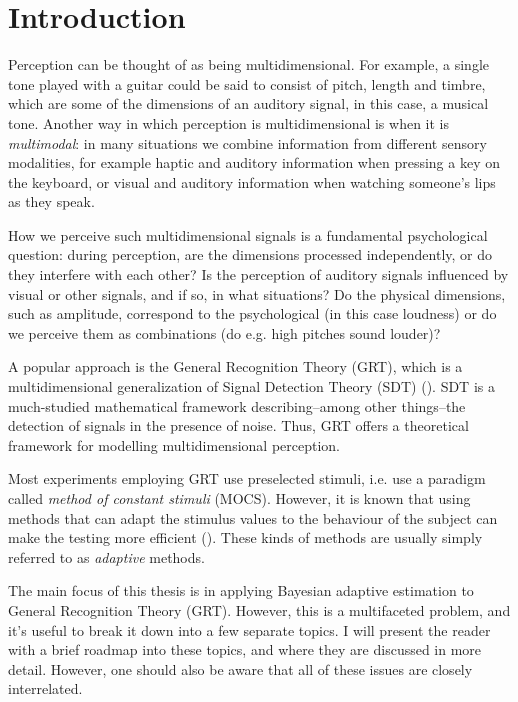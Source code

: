 \documentclass{article}\usepackage{knitr}
\begin{document}
\newpage

\tableofcontents

\newpage

\setcounter{page}{1}

\newpage


\section{Introduction}

Perception can be thought of as being multidimensional. For example, a single tone played with a guitar could be said to consist of pitch, length and timbre, which are some of the dimensions of an auditory signal, in this case, a musical tone. Another way in which perception is multidimensional is when it is \textit{multimodal}: in many situations we combine information from different sensory modalities, for example haptic and auditory information when pressing a key on the keyboard, or visual and auditory information when watching someone's lips as they speak.

How we perceive such multidimensional signals is a fundamental psychological question: during perception, are the dimensions processed independently, or do they interfere with each other? Is the perception of auditory signals influenced by visual or other signals, and if so, in what situations? Do the physical dimensions, such as amplitude, correspond to the psychological (in this case loudness) or do we perceive them as combinations (do e.g. high pitches sound louder)?

A popular approach is the General Recognition Theory (GRT), which is a multidimensional generalization of Signal Detection Theory (SDT) (\citealp{wickens2002,ashby1986, ashby2015}). SDT is a much-studied mathematical framework describing--among other things--the detection of signals in the presence of noise. Thus, GRT offers a theoretical framework for modelling multidimensional perception. 

Most experiments employing GRT use preselected stimuli, i.e. use a paradigm called \textit{method of constant stimuli} (MOCS).  However, it is known that using methods that can adapt the stimulus values to the behaviour of the subject can make the testing more efficient (\citealp{kontsevichtyler1999}). These kinds of methods are usually simply referred to as \textit{adaptive} methods.

The main focus of this thesis is in applying Bayesian adaptive estimation to General Recognition Theory (GRT). However, this is a multifaceted problem, and it's useful to break it down into a few separate topics. I will present the reader with a brief roadmap into these topics, and where they are discussed in more detail. However, one should also be aware that all of these issues are closely interrelated.
\end{document}
